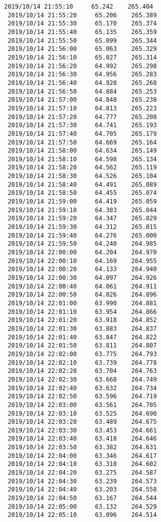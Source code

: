 \documentclass[11pt]{article}
\begin{document}
\begin{Verbatim}[commandchars=\\\{\}]
 2019/10/14 21:55:10     65.242    265.404
 2019/10/14 21:55:20     65.206    265.389
 2019/10/14 21:55:30     65.170    265.374
 2019/10/14 21:55:40     65.135    265.359
 2019/10/14 21:55:50     65.099    265.344
 2019/10/14 21:56:00     65.063    265.329
 2019/10/14 21:56:10     65.027    265.314
 2019/10/14 21:56:20     64.992    265.298
 2019/10/14 21:56:30     64.956    265.283
 2019/10/14 21:56:40     64.920    265.268
 2019/10/14 21:56:50     64.884    265.253
 2019/10/14 21:57:00     64.848    265.238
 2019/10/14 21:57:10     64.813    265.223
 2019/10/14 21:57:20     64.777    265.208
 2019/10/14 21:57:30     64.741    265.193
 2019/10/14 21:57:40     64.705    265.179
 2019/10/14 21:57:50     64.669    265.164
 2019/10/14 21:58:00     64.634    265.149
 2019/10/14 21:58:10     64.598    265.134
 2019/10/14 21:58:20     64.562    265.119
 2019/10/14 21:58:30     64.526    265.104
 2019/10/14 21:58:40     64.491    265.089
 2019/10/14 21:58:50     64.455    265.074
 2019/10/14 21:59:00     64.419    265.059
 2019/10/14 21:59:10     64.383    265.044
 2019/10/14 21:59:20     64.347    265.029
 2019/10/14 21:59:30     64.312    265.015
 2019/10/14 21:59:40     64.276    265.000
 2019/10/14 21:59:50     64.240    264.985
 2019/10/14 22:00:00     64.204    264.970
 2019/10/14 22:00:10     64.169    264.955
 2019/10/14 22:00:20     64.133    264.940
 2019/10/14 22:00:30     64.097    264.926
 2019/10/14 22:00:40     64.061    264.911
 2019/10/14 22:00:50     64.026    264.896
 2019/10/14 22:01:00     63.990    264.881
 2019/10/14 22:01:10     63.954    264.866
 2019/10/14 22:01:20     63.918    264.852
 2019/10/14 22:01:30     63.883    264.837
 2019/10/14 22:01:40     63.847    264.822
 2019/10/14 22:01:50     63.811    264.807
 2019/10/14 22:02:00     63.775    264.793
 2019/10/14 22:02:10     63.739    264.778
 2019/10/14 22:02:20     63.704    264.763
 2019/10/14 22:02:30     63.668    264.749
 2019/10/14 22:02:40     63.632    264.734
 2019/10/14 22:02:50     63.596    264.719
 2019/10/14 22:03:00     63.561    264.705
 2019/10/14 22:03:10     63.525    264.690
 2019/10/14 22:03:20     63.489    264.675
 2019/10/14 22:03:30     63.453    264.661
 2019/10/14 22:03:40     63.418    264.646
 2019/10/14 22:03:50     63.382    264.631
 2019/10/14 22:04:00     63.346    264.617
 2019/10/14 22:04:10     63.310    264.602
 2019/10/14 22:04:20     63.275    264.587
 2019/10/14 22:04:30     63.239    264.573
 2019/10/14 22:04:40     63.203    264.558
 2019/10/14 22:04:50     63.167    264.544
 2019/10/14 22:05:00     63.132    264.529
 2019/10/14 22:05:10     63.096    264.514

\end{Verbatim}
\end{document}

